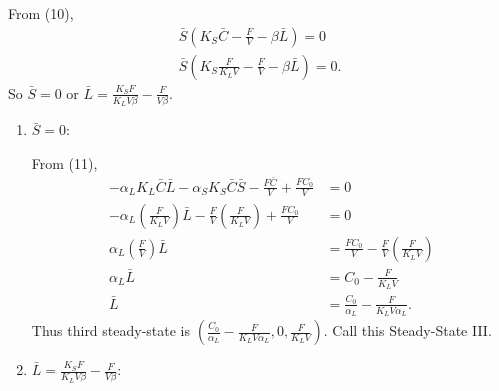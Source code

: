   From (10), 
  \begin{align*}
    \bar{S}\left( K_S \bar{C} - \frac{F}{V} - \beta \bar{L} \right) = 0 \\
    \bar{S}\left( K_S \frac{F}{K_L V} - \frac{F}{V} - \beta \bar{L} \right) = 0.
  \end{align*}
  So $\bar{S} = 0$ or $\bar{L} = \frac{K_S F}{K_L V \beta} - \frac{F}{V \beta}$.
  
  \begin{enumerate}

    \item $\bar{S} = 0$:
      
    From (11), 
    \begin{align*}
      -\alpha_L K_L \bar{C}\bar{L} -\alpha_S K_S \bar{C}\bar{S} - \frac{F\bar{C}}{V} + \frac{FC_0}{V} &= 0 \\
      -\alpha_L \left( \frac{F}{K_L V} \right) \bar{L} - \frac{F}{V} \left( \frac{F}{K_L V} \right) + \frac{FC_0}{V} &= 0 \\
      \alpha_L \left( \frac{F}{V} \right) \bar{L} &= \frac{FC_0}{V} - \frac{F}{V} \left( \frac{F}{K_L V} \right) \\
      \alpha_L \bar{L} &= C_0 - \frac{F}{K_L V} \\
      \bar{L} &= \frac{C_0}{\alpha_L} - \frac{F}{K_L V \alpha_L}.
    \end{align*}
    Thus third steady-state is {\color{red}$\left( \frac{C_0}{\alpha_L} - \frac{F}{K_L V \alpha_L}, 0, \frac{F}{K_L V} \right)$}.  Call this {\color{red}Steady-State III}.

    \item $\bar{L} = \frac{K_S F}{K_L V \beta} - \frac{F}{V \beta}$:


\end{enumerate}
